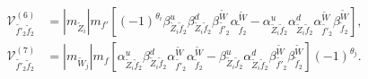 \documentclass[final,3p,times]{elsarticle}
\begin{document}
\begin{align}
\mathcal{V}_{\tilde{f'}_2 \tilde{f}_2}^{(6)} &= |m_{\tilde{Z}_i}| m_{f'} \left[(-1)^{\theta_i}\beta_{\tilde{Z}_i \tilde{f}_2}^{u} \beta_{\tilde{Z}_i \tilde{f}_2}^{d} \beta_{\tilde{f'}_2}^{\tilde{W}} \alpha_{\tilde{f}_2}^{\tilde{W}} - \alpha_{\tilde{Z}_i \tilde{f}_2}^{u} \alpha_{\tilde{Z}_i \tilde{f}_2}^{d} \alpha_{\tilde{f'}_2}^{\tilde{W}} \beta_{\tilde{f}_2}^{\tilde{W}}\right], \\
\mathcal{V}_{\tilde{f'}_2 \tilde{f}_2}^{(7)} &= |m_{\tilde{W}_j}|m_{f}\left[ \alpha_{\tilde{Z}_i \tilde{f}_2}^{u} \beta_{\tilde{Z}_i \tilde{f}_2}^{d} \alpha_{\tilde{f'}_2}^{\tilde{W}} \alpha_{\tilde{f}_2}^{\tilde{W}} -  \beta_{\tilde{Z}_i \tilde{f}_2}^{u} \alpha_{\tilde{Z}_i \tilde{f}_2}^{d} \beta_{\tilde{f'}_2}^{\tilde{W}} \beta_{\tilde{f}_2}^{\tilde{W}}\right](-1)^{\theta_j}.
\end{align}
\end{document}
